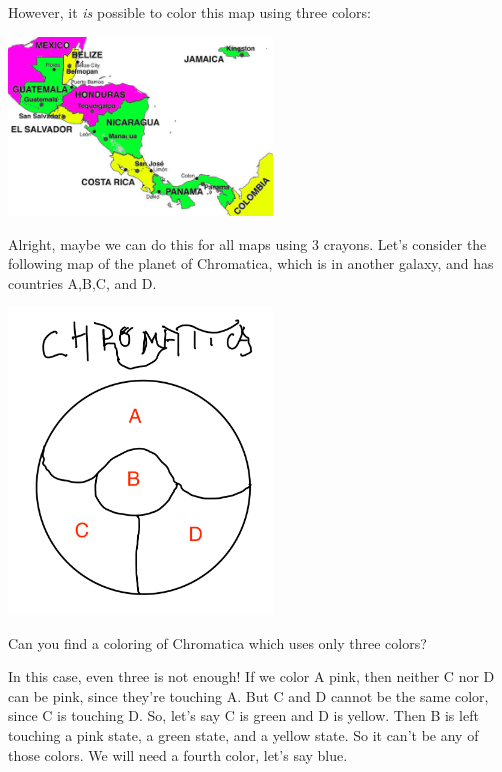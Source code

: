 However, it \textit{is} possible to color this map using three colors:

\begin{center}
\includegraphics[width=7cm]{pics/central-america-colored.png}
\end{center}


Alright, maybe we can do this for all maps using 3 crayons. Let's consider the following map of the planet of Chromatica, which is in another galaxy, and has countries A,B,C, and D.

\begin{center}
\includegraphics[width=7cm]{pics/chromatica-uncolored.png}
\end{center}

\begin{question}
Can you find a coloring of Chromatica which uses only three colors?
\end{question}

In this case, even three is not enough! If we color A pink, then neither C nor D can be pink, since they're touching A. But C and D cannot be the same color, since C is touching D. So, let's say C is green and D is yellow. Then B is left touching a pink state, a green state, and a yellow state. So it can't be any of those colors. We will need a fourth color, let's say blue.


